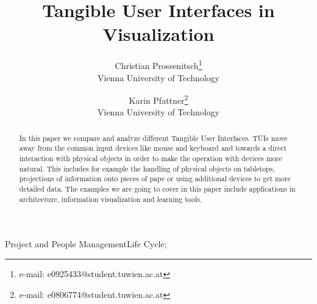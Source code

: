 \documentclass[preprint]{acmsiggraph}    %
\title{Tangible User Interfaces in Visualization}
\author{Christian Prossenitsch\thanks{e-mail: e0925433@student.tuwien.ac.at}\\ Vienna University of Technology %
\and Karin Pfattner\thanks{e-mail: e0806774@student.tuwien.ac.at}\\ Vienna University of Technology}%
\begin{document}

\maketitle


\begin{abstract}


In this paper we compare and analyze different Tangible User Interfaces. TUIs move away from the common input devices like mouse and keyboard and towards a direct interaction with physical objects in order to make the operation with devices more natural. This includes for example the handling of physical objects on tabletops, projections of information onto pieces of pape or using additional devices to get more detailed data. The examples we are going to cover in this paper include applications in architecture, information visualization and learning tools. 



\end{abstract}


\begin{CRcatlist}
{Project and People Management}{Life Cycle};
\end{CRcatlist}

\keywordlist









\nocite{*}

\end{document}
